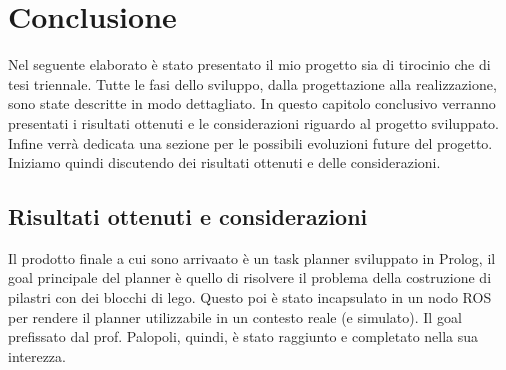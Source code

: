\clearpage
\newpage
\chapter{Conclusione}
\label{cha:conclusione}
Nel seguente elaborato è stato presentato il mio progetto sia di tirocinio che di tesi triennale. Tutte le fasi dello sviluppo, dalla progettazione alla realizzazione, sono state descritte in modo dettagliato.
In questo capitolo conclusivo verranno presentati i risultati ottenuti e le considerazioni riguardo al progetto sviluppato. Infine verrà dedicata una sezione per le possibili evoluzioni future del progetto.
Iniziamo quindi discutendo dei risultati ottenuti e delle considerazioni.

\section{Risultati ottenuti e considerazioni}
\label{sec:risultati}
Il prodotto finale a cui sono arrivaato è un task planner sviluppato in Prolog, il goal principale del planner è quello di risolvere il problema della costruzione di pilastri con dei blocchi di lego.
Questo poi è stato incapsulato in un nodo ROS per rendere il planner utilizzabile in un contesto reale (e simulato). 
Il goal prefissato dal prof. Palopoli, quindi, è stato raggiunto e completato nella sua interezza.

